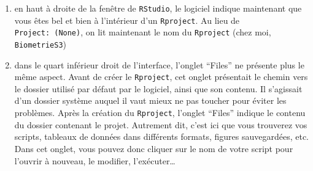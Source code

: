 \documentclass[
  letterpaper,
  DIV=11,
  numbers=noendperiod]{scrreprt}
\providecommand{\tightlist}{%
  \setlength{\itemsep}{0pt}\setlength{\parskip}{0pt}}\usepackage{longtable,booktabs,array}
\begin{document}
\begin{enumerate}
\def\labelenumi{\arabic{enumi}.}
\tightlist
\item
  en haut à droite de la fenêtre de \texttt{RStudio}, le logiciel
  indique maintenant que vous êtes bel et bien à l'intérieur d'un
  \texttt{Rproject}. Au lieu de \texttt{Project:\ (None)}, on lit
  maintenant le nom du \texttt{Rproject} (chez moi,
  \texttt{BiometrieS3})
\item
  dans le quart inférieur droit de l'interface, l'onglet ``Files'' ne
  présente plus le même aspect. Avant de créer le \texttt{Rproject}, cet
  onglet présentait le chemin vers le dossier utilisé par défaut par le
  logiciel, ainsi que son contenu. Il s'agissait d'un dossier système
  auquel il vaut mieux ne pas toucher pour éviter les problèmes. Après
  la création du \texttt{Rproject}, l'onglet ``Files'' indique le
  contenu du dossier contenant le projet. Autrement dit, c'est ici que
  vous trouverez vos scripts, tableaux de données dans différents
  formats, figures sauvegardées, etc. Dans cet onglet, vous pouvez donc
  cliquer sur le nom de votre script pour l'ouvrir à nouveau, le
  modifier, l'exécuter\ldots{}
\end{enumerate}
\end{document}
